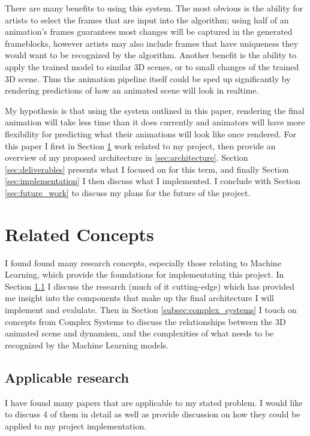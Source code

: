 \documentclass[conference]{IEEEtran}
\begin{document}
There are many benefits to using this system. The most obvious is the ability
for artists to select the frames that are input into the algorithm; using half
of an animation's frames guarantees most changes will be captured in the
generated frameblocks, however artists may also include frames that have
uniqueness they would want to be recognized by the algorithm. Another benefit is
the ability to apply the trained model to similar 3D scenes, or to small changes
of the trained 3D scene. Thus the animation pipeline itself could be sped up
significantly by rendering predictions of how an animated scene will look in
realtime.

My hypothesis is that using the system outlined in this paper, rendering the
final animation will take less time than it does currently and animators will
have more flexibility for predicting what their animations will look like once
rendered. For this paper I first in Section \ref{sec:related_concepts} work
related to my project, then provide an overview
of my proposed architecture in \ref{sec:architecture}. Section
\ref{sec:deliverables} presents what I focused on for this term, and finally
Section \ref{sec:implementation} I then discuss what I implemented.
I conclude with Section \ref{sec:future_work} to discuss my plans for the future of
the project.

\section{Related Concepts}
\label{sec:related_concepts}
I found found many research concepts, especially those relating to Machine Learning,
which provide the foundations for implementating this project.
In Section \ref{subsec:applicable} I discuss the
research (much of it cutting-edge) which has provided me insight into the
components that make up the final architecture I will implement and evalulate.
Then in Section \ref{subsec:complex_systems} I
touch on concepts from Complex Systems to discuss the relationships between
the 3D animated scene and dynamism, and the complexities of what needs to be
recognized by the Machine Learning models.

\subsection{Applicable research}
\label{subsec:applicable}
I have found many papers that are applicable to my stated problem. I would like
to discuss 4 of them in detail as well as provide
discussion on how they could be applied to my project implementation.
\end{document}
